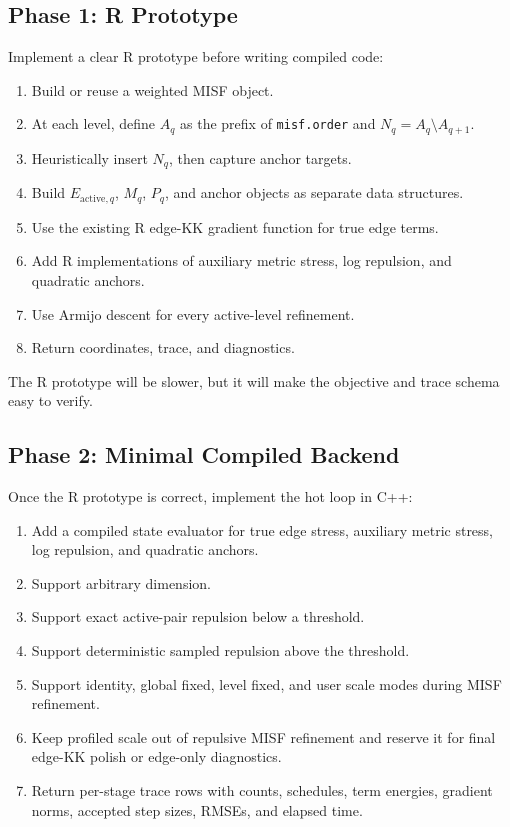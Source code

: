 \documentclass[11pt]{article}
\begin{document}
\subsection{Phase 1: R Prototype}

Implement a clear R prototype before writing compiled code:
\begin{enumerate}[leftmargin=2em]
  \item Build or reuse a weighted MISF object.
  \item At each level, define \(A_q\) as the prefix of \texttt{misf.order} and
  \(N_q=A_q\setminus A_{q+1}\).
  \item Heuristically insert \(N_q\), then capture anchor targets.
  \item Build \(E_{\mathrm{active},q}\), \(M_q\), \(P_q\), and anchor objects as
  separate data structures.
  \item Use the existing R edge-KK gradient function for true edge terms.
  \item Add R implementations of auxiliary metric stress, log repulsion, and
  quadratic anchors.
  \item Use Armijo descent for every active-level refinement.
  \item Return coordinates, trace, and diagnostics.
\end{enumerate}

The R prototype will be slower, but it will make the objective and trace schema
easy to verify.

\subsection{Phase 2: Minimal Compiled Backend}

Once the R prototype is correct, implement the hot loop in C++:
\begin{enumerate}[leftmargin=2em]
  \item Add a compiled state evaluator for true edge stress, auxiliary metric
  stress, log repulsion, and quadratic anchors.
  \item Support arbitrary dimension.
  \item Support exact active-pair repulsion below a threshold.
  \item Support deterministic sampled repulsion above the threshold.
  \item Support identity, global fixed, level fixed, and user scale modes during
  MISF refinement.
  \item Keep profiled scale out of repulsive MISF refinement and reserve it for
  final edge-KK polish or edge-only diagnostics.
  \item Return per-stage trace rows with counts, schedules, term energies,
  gradient norms, accepted step sizes, RMSEs, and elapsed time.
\end{enumerate}
\end{document}
